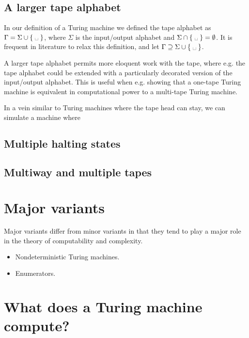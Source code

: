\subsection{A larger tape alphabet}

In our definition of a Turing machine we defined the tape alphabet as $\Gamma =
\Sigma \cup \set{\blank}$, where $\Sigma$ is the input/output alphabet and
$\Sigma \cap \set{\blank} = \emptyset$. It is frequent in literature to relax
this definition, and let $\Gamma \supseteq \Sigma \cup \set{\blank}$.

A larger tape alphabet permits more eloquent work with the tape, where e.g. the
tape alphabet could be extended with a particularly decorated version of the
input/output alphabet. This is useful when e.g. showing that a one-tape Turing
machine is equivalent in computational power to a multi-tape Turing machine.

In a vein similar to Turing machines where the tape head can stay, we can
simulate a machine where

\subsection{Multiple halting states}

\subsection{Multiway and multiple tapes}

\section{Major variants}

Major variants differ from minor variants in that they tend to play a major
role in the theory of computability and complexity.

\begin{itemize}

\item Nondeterministic Turing machines.

\item Enumerators.

\end{itemize}

\section{What does a Turing machine compute?}\label{sec:background-what-tm-computes}

